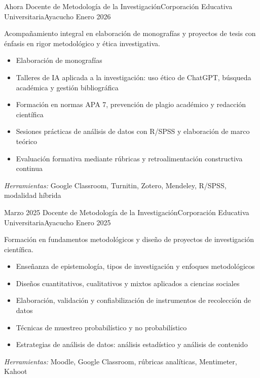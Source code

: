 
\begin{experiences}

\experience
{Ahora} {Docente de Metodología de la Investigación}{Corporación Educativa Universitaria}{Ayacucho}
{Enero 2026} {
	Acompañamiento integral en elaboración de monografías y proyectos de tesis con énfasis en rigor metodológico y ética investigativa.
	\begin{itemize}
		\item Elaboración de monografías
		\item Talleres de IA aplicada a la investigación: uso ético de ChatGPT, búsqueda académica y gestión bibliográfica
		\item Formación en normas APA 7, prevención de plagio académico y redacción científica
		\item Sesiones prácticas de análisis de datos con R/SPSS y elaboración de marco teórico
		\item Evaluación formativa mediante rúbricas y retroalimentación constructiva continua
	\end{itemize}
}
{\footnotesize{\emph{Herramientas:} Google Classroom, Turnitin, Zotero, Mendeley, R/SPSS, modalidad híbrida}}
\emptySeparator

\experience
{Marzo 2025} {Docente de Metodología de la Investigación}{Corporación Educativa Universitaria}{Ayacucho}
{Enero 2025} {
	Formación en fundamentos metodológicos y diseño de proyectos de investigación científica.
	\begin{itemize}
		\item Enseñanza de epistemología, tipos de investigación y enfoques metodológicos
		\item Diseños cuantitativos, cualitativos y mixtos aplicados a ciencias sociales
		\item Elaboración, validación y confiabilización de instrumentos de recolección de datos
		\item Técnicas de muestreo probabilístico y no probabilístico
		\item Estrategias de análisis de datos: análisis estadístico y análisis de contenido
	\end{itemize}
}
{\footnotesize{\emph{Herramientas:} Moodle, Google Classroom, rúbricas analíticas, Mentimeter, Kahoot}}
\emptySeparator


\end{experiences}
